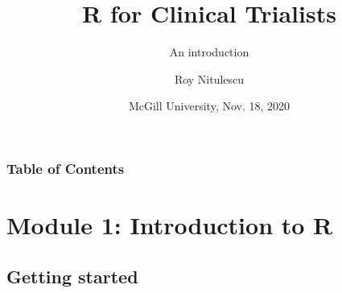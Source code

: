 \documentclass{beamer}
\title{R for Clinical Trialists}
\subtitle{An introduction}
\author{Roy Nitulescu\inst{1}}
\institute
{
    \inst{1}%
    CITADEL\\
    CR-CHUM
}
\date[McGill, Nov. 18, 2020]{McGill University, Nov. 18, 2020}
\begin{document}

\frame{\titlepage}

\begin{frame}
    \frametitle{Table of Contents}
    \tableofcontents
\end{frame}



\section{Module 1: Introduction to R}

\subsection{Getting started}

\end{document}
